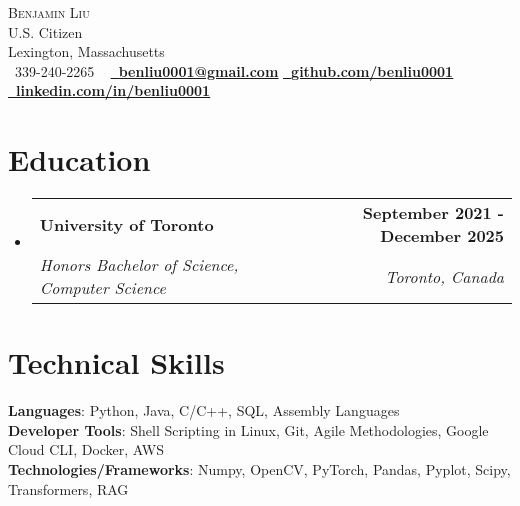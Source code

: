 \documentclass[letterpaper,11pt]{article}
\makeatletter
\let\oldhref\href
\renewcommand{\href}[2]{\oldhref{#1}{\bfseries#2}}
\newcommand{\resumeSubheading}[4]{
  \vspace{-2pt}\item
    \begin{tabular*}{1.0\textwidth}[t]{l@{\extracolsep{\fill}}r}
      \textbf{#1} & \textbf{\small #2} \\
      \textit{\small#3} & \textit{\small #4} \\
    \end{tabular*}\vspace{-7pt}
}
\newcommand{\resumeSubHeadingListStart}{\begin{itemize}[leftmargin=0.0in, label={}]}
\newcommand{\resumeSubHeadingListEnd}{\end{itemize}}
\makeatother
\begin{document}

\begin{center}
    {\Huge \scshape Benjamin Liu} \\ \vspace{1pt}
    U.S. Citizen \\ \vspace{1pt}
    Lexington, Massachusetts \\ \vspace{1pt}
    \small \raisebox{-0.1\height}\faPhone\ 339-240-2265 ~ \href{mailto:benliu0001@gmail.com}{\raisebox{-0.2\height} \faEnvelope\  \underline{benliu0001@gmail.com}} \href{https://github.com/benliu0001}{\raisebox{-0.2\height}\faGithub\ \underline{github.com/benliu0001}} \href{https://www.linkedin.com/in/benliu0001/}{\raisebox{-0.2\height}\faLinkedin\ \underline{linkedin.com/in/benliu0001}} \\ 
    \vspace{-8pt}
\end{center}


\section{Education}
  \resumeSubHeadingListStart
    \resumeSubheading
      {University of Toronto}{September 2021 - December 2025}
      {Honors Bachelor of Science, Computer Science}{Toronto, Canada}
  \resumeSubHeadingListEnd
  \vspace{-20pt}
\section{Technical Skills}
\begin{itemize}[leftmargin=0.15in, label={}]
   \small{\item{
    \textbf{Languages}{: Python, Java, C/C++, SQL, Assembly Languages} \\
    \textbf{Developer Tools}{: Shell Scripting in Linux, Git, Agile Methodologies, Google Cloud CLI, Docker, AWS} \\
    \textbf{Technologies/Frameworks}{: Numpy, OpenCV, PyTorch, Pandas, Pyplot, Scipy, Transformers, RAG} \\
   }}
\end{itemize}
\vspace{-23pt}
\end{document}
